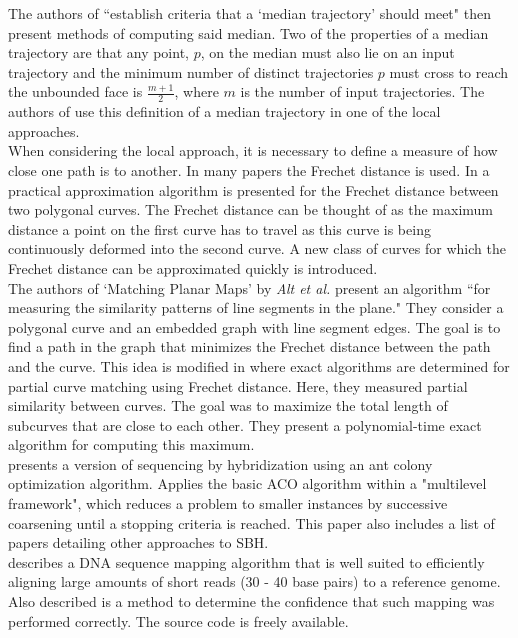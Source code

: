 \documentclass[12pt]{article}
\begin{document}
\indent The authors of \cite{Buchin10} ``establish criteria that a `median trajectory' should meet" then present methods of computing said median. Two of the properties of a median trajectory are that any point, $p$, on the median must also lie on an input trajectory and the minimum number of distinct trajectories $p$ must cross to reach the unbounded face is $\frac{m+1}{2}$, where $m$ is the number of input trajectories. The authors of \cite{Joy12} use this definition of a median trajectory in one of the local approaches.\\
\indent When considering the local approach, it is necessary to define a measure of how close one path is to another. In many papers the Frechet distance is used. In \cite{Driemel10} a practical approximation algorithm is presented for the Frechet distance between two polygonal curves. The Frechet distance can be thought of as the maximum distance a point on the first curve has to travel as this curve is being continuously deformed into the second curve. A new class of curves for which the Frechet distance can be approximated quickly is introduced.\\
\indent The authors of `Matching Planar Maps' by {\it Alt et al.} \cite{Alt03} present an algorithm ``for measuring the similarity patterns of line segments in the plane." They consider a polygonal curve and an embedded graph with line segment edges. The goal is to find a path in the graph that minimizes the Frechet distance between the path and the curve. This idea is modified in \cite{Buchin09} where exact algorithms are determined for partial curve matching using Frechet distance. Here, they measured partial similarity between curves. The goal was to maximize the total length of subcurves that are close to each other. They present a polynomial-time exact algorithm for computing this maximum.\\
\indent \cite{Blum2008ant} presents a version of sequencing by hybridization using an ant colony optimization algorithm. Applies the basic ACO algorithm within a "multilevel framework", which reduces a problem to smaller instances by successive coarsening until a stopping criteria is reached. This paper also includes a list of papers detailing other approaches to SBH.\\
\indent \cite{Li2008map} describes a DNA sequence mapping algorithm that is well suited to efficiently aligning large amounts of short reads (30 - 40 base pairs) to a reference genome. Also described is a method to determine the confidence that such mapping was performed correctly. The source code is freely available.\\
\end{document}
